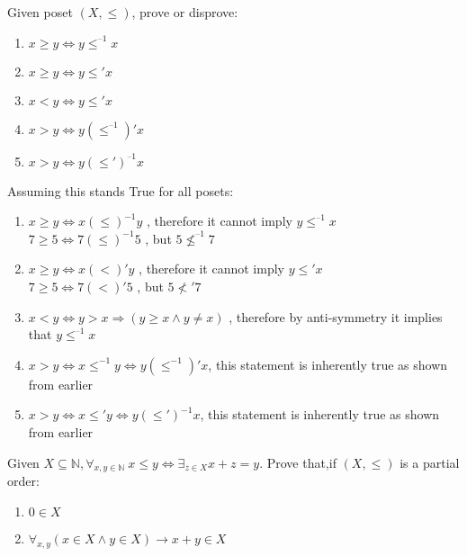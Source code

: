 \documentclass[12pt]{article}
\newcommand{\N}{\mathbb{N}}
\newenvironment{solution}[2][Solution]{ \begin{trivlist}
\item[\hskip \labelsep {\bfseries #1}]}{\end{trivlist}}
\newenvironment{problem}[2][Problem]{\begin{trivlist}
\item[\hskip \labelsep {\bfseries #1}\hskip \labelsep {\bfseries #2.}]}{\end{trivlist}}
\begin{document}
\begin{problem}{9}
 Given poset $(X, \le)$, prove or disprove:
\item[]
\begin{enumerate}[label=\alph*)]
    \item $x \ge y \Leftrightarrow y \le^{\text{--}1} x$
    \item $x \ge y \Leftrightarrow y \le' x$
    \item $x < y \Leftrightarrow y \le' x$
    \item $x > y \Leftrightarrow y (\le^{\text{--}1})' x$
    \item $x > y \Leftrightarrow y (\le')^{\text{--}1} x$
\end{enumerate}
\end{problem}
\begin{solution}{9}
Assuming this stands True for all posets:
\begin{enumerate}[label=\alph*)]
    \item $x \ge y \Leftrightarrow x (\le)^{-1} y$ , therefore it cannot imply $y \le^{\text{--}1} x$ \\
    $7 \ge 5 \Leftrightarrow 7 (\le)^{-1} 5$ , but $5 \nleqslant^{\text{--}1} 7$
    \item $x \ge y \Leftrightarrow x (<)' y$ , therefore it cannot imply $y \le' x$ \\
    $7 \ge 5 \Leftrightarrow 7 (<)' 5$ , but $5 \nless' 7$
    \item $x < y \Leftrightarrow y > x \Rightarrow (y \geq x \wedge y \neq x)$ , therefore by anti-symmetry it implies that $y \le^{\text{--}1} x$
    \item $x > y \Leftrightarrow x \leq^{-1} y \Leftrightarrow y (\le^{-1})' x$, this statement is inherently true as shown from earlier
    \item $x > y \Leftrightarrow x \le' y \Leftrightarrow y (\le')^{-1} x$, this statement is inherently true as shown from earlier
\end{enumerate}
\end{solution}
\vskip 0.1in
\begin{problem}{10}Given $X \subseteq \N, \forall_{x,y\in\N}\ x \le y \Leftrightarrow \exists_{z \in X} x+z=y$. Prove that,if $(X,\le)$ is a partial order:
\item[]
\begin{enumerate}[label=\alph*)]
    \item $0 \in X$
    \item $\forall_{x,y} (x \in X \wedge y \in X) \rightarrow x + y \in X$
\end{enumerate}
\end{problem}
\end{document}
